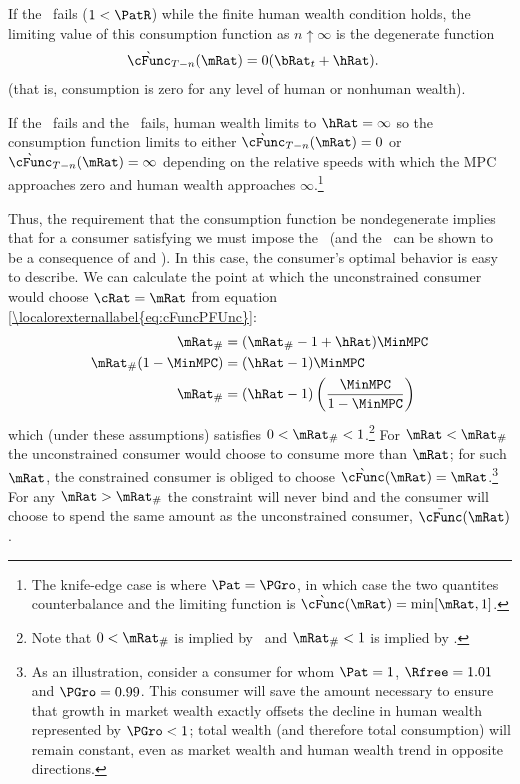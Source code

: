 \documentclass[../BufferStockTheory.tex]{subfiles}
\begin{document}
If the \RIC~fails ($1 < \PatR$) while the finite human wealth condition
holds, the limiting value of this consumption function as $n \uparrow
\infty$ is the degenerate function
\begin{align}
  \grave{\cFunc}_{T-n}(\mRat)  & = 0 (\bRat_{t}+\hRat).
\end{align}
(that is, consumption is zero for any level of human or nonhuman wealth).

If the \RIC~fails and the \FHWC~fails, human wealth limits to $\hRat =
\infty$ so the consumption function limits to either
$\grave{\cFunc}_{T-n}(\mRat) = 0$ or
$\grave{\cFunc}_{T-n}(\mRat) = \infty$ depending on the relative
speeds with which the MPC approaches zero and human wealth approaches
$\infty$.\footnote{The knife-edge case is where $\Pat = \PGro$, in
  which case the two quantites counterbalance and the limiting
  function is $\grave{\cFunc}(\mRat)=\min[\mRat,1]$.}

\let\TableWidth\relax
\newlength\TableWidth

Thus, the requirement that the consumption function be nondegenerate
implies that for a consumer satisfying \cncl{\PFGIC} we must impose
the \RIC~(and the \FHWC~can be shown to be a consequence of \cncl{\PFGIC} and \RIC).  In
this case, the consumer's optimal behavior is easy to describe.  We
can calculate the point at which the unconstrained consumer would
choose $\cRat = \mRat$ from equation \eqref{\localorexternallabel{eq:cFuncPFUnc}}:
\begin{align}
  \mRat_{\#}  & = (\mRat_{\#}-1+\hRat)\MinMPC
\\ \mRat_{\#}(1-\MinMPC)  & = (\hRat - 1)\MinMPC
\\ \mRat_{\#}  & = (\hRat - 1)\left(\frac{\MinMPC}{1-\MinMPC}\right)
\end{align}
which (under these assumptions) satisfies $0 < \mRat_{\#} < 1$.\footnote{Note that $0 < \mRat_{\#}$ is implied by \RIC~and $ \mRat_{\#}<1$ is implied by \cncl{\PFGIC}.}  For
$\mRat < \mRat_{\#}$ the unconstrained consumer would choose to
consume more than $\mRat$; for such $\mRat$, the constrained consumer
is obliged to choose $\grave{\cFunc}(\mRat) = \mRat$.\footnote{As an
  illustration, consider a consumer for whom $\Pat = 1$, $\Rfree
  =1.01$ and $\PGro = 0.99$.  This consumer will save the amount
  necessary to ensure that growth in market wealth exactly offsets the
  decline in human wealth represented by $\PGro < 1$; total wealth
  (and therefore total consumption) will remain constant, even as
  market wealth and human wealth trend in opposite directions.}  For
any $\mRat > \mRat_{\#}$ the constraint will never bind and the
consumer will choose to spend the same amount as the unconstrained
consumer, $\bar{\cFunc}(\mRat)$.
\end{document}
